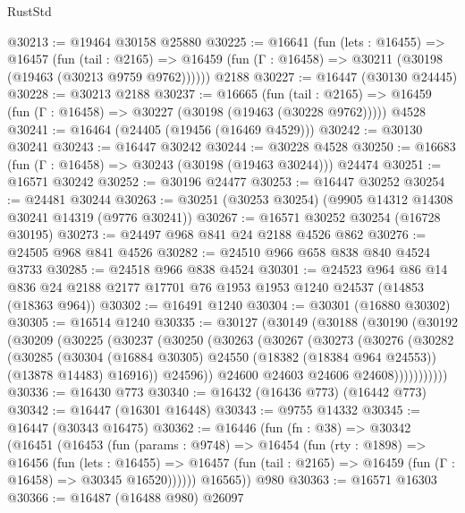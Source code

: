 \begin{lexlean}{RustStd}
\begin{coremodule}
@30213 := @19464 @30158 @25880
@30225 := @16641
    (fun (lets : @16455) =>
    @16457
      (fun (tail : @2165) =>
      @16459 (fun (Γ : @16458) => @30211 (@30198 (@19463 (@30213 @9759 @9762))))))
    @2188
@30227 := @16447 (@30130 @24445)
@30228 := @30213 @2188
@30237 := @16665
    (fun (tail : @2165) => @16459 (fun (Γ : @16458) => @30227 (@30198 (@19463 (@30228 @9762)))))
    @4528
@30241 := @16464 (@24405 (@19456 (@16469 @4529)))
@30242 := @30130 @30241
@30243 := @16447 @30242
@30244 := @30228 @4528
@30250 := @16683 (fun (Γ : @16458) => @30243 (@30198 (@19463 @30244))) @24474
@30251 := @16571 @30242
@30252 := @30196 @24477
@30253 := @16447 @30252
@30254 := @24481 @30244
@30263 := @30251 (@30253 @30254) (@9905 @14312 @14308 @30241 @14319 (@9776 @30241))
@30267 := @16571 @30252 @30254 (@16728 @30195)
@30273 := @24497 @968 @841 @24 @2188 @4526 @862
@30276 := @24505 @968 @841 @4526
@30282 := @24510 @966 @658 @838 @840 @4524 @3733
@30285 := @24518 @966 @838 @4524
@30301 := @24523
    @964
    @86
    @14
    @836
    @24
    @2188
    @2177
    @17701
    @76
    @1953
    @1953
    @1240
    @24537
    (@14853 (@18363 @964))
@30302 := @16491 @1240
@30304 := @30301 (@16880 @30302)
@30305 := @16514 @1240
@30335 := @30127
    (@30149
      (@30188
        (@30190
          (@30192
            (@30209
              (@30225
                (@30237
                  (@30250
                    (@30263
                      (@30267
                        (@30273
                          (@30276
                            (@30282
                              (@30285
                                (@30304
                                  (@16884 @30305)
                                  @24550
                                  (@18382 (@18384 @964 @24553))
                                  (@13878 @14483)
                                  @16916))
                              @24596))
                          @24600
                          @24603
                          @24606
                          @24608)))))))))))
@30336 := @16430 @773
@30340 := @16432 (@16436 @773) (@16442 @773)
@30342 := @16447 (@16301 @16448)
@30343 := @9755 @14332
@30345 := @16447 (@30343 @16475)
@30362 := @16446
    (fun (fn : @38) =>
    @30342
      (@16451
        (@16453
          (fun (params : @9748) =>
          @16454
            (fun (rty : @1898) =>
            @16456
              (fun (lets : @16455) =>
              @16457 (fun (tail : @2165) => @16459 (fun (Γ : @16458) => @30345 @16520))))))
        @16565))
    @980
@30363 := @16571 @16303
@30366 := @16487 (@16488 @980) @26097

\end{coremodule}
\end{lexlean}
